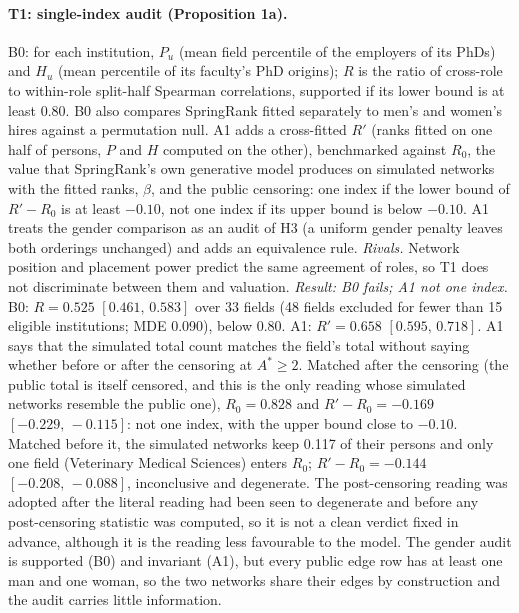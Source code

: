 \documentclass[11pt]{article}
\newcommand{\ci}[2]{$[#1,\allowbreak\,#2]$}
\begin{document}
\paragraph{T1: single-index audit (Proposition 1a).} B0: for each institution, $P_u$ (mean field percentile of the
employers of its PhDs) and $H_u$ (mean percentile of its faculty's PhD origins); $R$ is the ratio of cross-role to
within-role split-half Spearman correlations, supported if its lower bound is at least 0.80. B0 also compares
SpringRank fitted separately to men's and women's hires against a permutation null. A1 adds a cross-fitted $R'$
(ranks fitted on one half of persons, $P$ and $H$ computed on the other), benchmarked against $R_0$, the value that
SpringRank's own generative model produces on simulated networks with the fitted ranks, $\beta$, and the public
censoring: one index if the lower bound of $R'-R_0$ is at least $-0.10$, not one index if its upper bound is below
$-0.10$. A1 treats the gender comparison as an audit of H3 (a uniform gender penalty leaves both orderings
unchanged) and adds an equivalence rule. \emph{Rivals.} Network position and placement power predict the same
agreement of roles, so T1 does not discriminate between them and valuation. \emph{Result: B0 fails; A1 not one
index.} B0: $R=0.525$ \ci{0.461}{0.583} over 33 fields (48 fields excluded for fewer than 15 eligible
institutions; MDE 0.090), below 0.80. A1: $R'=0.658$ \ci{0.595}{0.718}. A1 says that the simulated total count
matches the field's total without saying whether before or after the censoring at $A^*\ge2$. Matched after the
censoring (the public total is itself censored, and this is the only reading whose simulated networks resemble the
public one), $R_0=0.828$ and $R'-R_0=-0.169$ \ci{-0.229}{-0.115}: not one index, with the upper bound close to
$-0.10$. Matched before it, the simulated networks keep 0.117 of their persons and only one field (Veterinary
Medical Sciences) enters $R_0$; $R'-R_0=-0.144$ \ci{-0.208}{-0.088}, inconclusive and degenerate. The post-censoring
reading was adopted after the literal reading had been seen to degenerate and before any post-censoring statistic
was computed, so it is not a clean verdict fixed in advance, although it is the reading less favourable to the
model. The gender audit is supported (B0) and invariant (A1), but every public edge row has at least one man and one
woman, so the two networks share their edges by construction and the audit carries little information.
\end{document}
